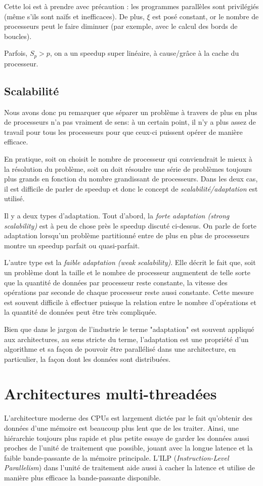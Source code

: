 	Cette loi est à prendre avec précaution : les programmes parallèles sont privilégiés (même s'ils sont naïfs et inefficaces). De plus, $\xi$ est posé constant, or le nombre de processeurs peut le faire diminuer (par exemple, avec le calcul des bords de boucles).
	
	Parfois, $S_p > p$, on a un speedup super linéaire, à cause/grâce à la cache du processeur.
		
	\subsection{Scalabilité}
	Nous avons donc pu remarquer que séparer un problème à travers de plus en plus de processeurs n'a pas vraiment de sens: à un certain point, il n'y a plus assez de travail pour tous les processeurs pour que ceux-ci puissent opérer de manière efficace.
	
	En pratique, soit on choisit le nombre de processeur qui conviendrait le mieux à la résolution du problème, soit on doit résoudre une série de problèmes toujours plus grands en fonction du nombre grandissant de processeurs. Dans les deux cas, il est difficile de parler de speedup et donc le concept de \textit{scalabilité/adaptation} est utilisé.
	
	Il y a deux types d'adaptation. Tout d'abord, la \textit{forte adaptation (strong scalability)} est à peu de chose près le speedup discuté ci-dessus. On parle de forte adaptation lorsqu'un problème partitionné entre de plus en plus de processeurs montre un speedup parfait ou quasi-parfait.
	
	L'autre type est la \textit{faible adaptation (weak scalability)}. Elle décrit le fait que, soit un problème dont la taille et le nombre de processeur augmentent de telle sorte que la quantité de données par processeur reste constante, la vitesse des opérations par seconde de chaque processeur reste aussi constante. Cette mesure est souvent difficile à effectuer puisque la relation entre le nombre d'opérations et la quantité de données peut être très compliquée.
	
	Bien que dans le jargon de l'industrie le terme "adaptation" est souvent appliqué aux architectures, au sens stricte du terme, l'adaptation est une propriété d'un algorithme et sa façon de pouvoir être parallélisé dans une architecture, en particulier, la façon dont les données sont distribuées.
	
\section{Architectures multi-threadées}
L'architecture moderne des CPUs est largement dictée par le fait qu'obtenir des données d'une mémoire est beaucoup plus lent que de les traiter. Ainsi, une hiérarchie toujours plus rapide et plus petite essaye de garder les données aussi proches de l'unité de traitement que possible, jouant avec la longue latence et la faible bande-passante de la mémoire principale. L'ILP (\textit{Instruction-Level Parallelism}) dans l'unité de traitement aide aussi à cacher la latence et utilise de manière plus efficace la bande-passante disponible. 

